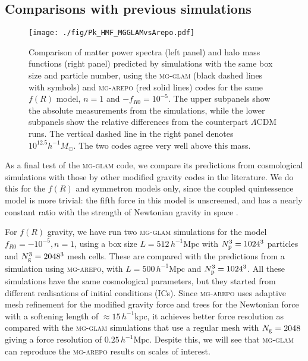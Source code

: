 \subsection{Comparisons with previous simulations}
\label{subsect:comparions}

\begin{figure}
    \centering 
    \texttt{[image: ./fig/Pk\_HMF\_MGGLAMvsArepo.pdf]}
    \caption{Comparison of matter power spectra (left panel) and halo mass functions (right panel) predicted by simulations with the same box size and particle number, using the \textsc{mg-glam} (black dashed lines with symbols) and \textsc{mg-arepo} (red solid lines) codes for the same $f(R)$ model, $n=1$ and $-f_{R0}=10^{-5}$. The upper subpanels show the absolute measurements from the simulations, while the lower subpanels show the relative differences from the counterpart $\Lambda$CDM runs. The vertical dashed line in the right panel denotes $10^{12.5}h^{-1}M_\odot$. The two codes agree very well above this mass.
    }
    \label{fig:Pk_hmf_MGGLAMvsArepo}
\end{figure}

As a final test of the \textsc{mg-glam} code, we compare its predictions from cosmological simulations with those by other modified gravity codes in the literature. We do this for the $f(R)$ and symmetron models only, since the coupled quintessence model is more trivial: the fifth force in this model is unscreened, and has a nearly constant ratio with the strength of Newtonian gravity in space \cite{Li:2010re}. 

For $f(R)$ gravity, we have run two \textsc{mg-glam} simulations for the model $f_{R0}=-10^{-5}, n=1$, using a box size $L=512 \, h^{-1}\mathrm{Mpc}$ with $N_{\rm p}^3 = 1024^3$ particles and  $N_{\rm g}^3=2048^3$ mesh cells. These are compared with the predictions from a simulation using \textsc{mg-arepo}, with $L = 500 \, h^{-1}\mathrm{Mpc}$ and $N_{\rm p}^3 = 1024^3$. All these simulations have the same cosmological parameters, but they started from different realisations of initial conditions (ICs). Since \textsc{mg-arepo} uses adaptive mesh refinement for the modified gravity force and trees for the Newtonian force with a softening length of $\approx 15 \, h^{-1}\mathrm{kpc}$, it achieves better force resolution as compared with the \textsc{mg-glam} simulations that use a regular mesh with $N_{\rm g}=2048$ giving a force resolution of $0.25 \, h^{-1}\mathrm{Mpc}$. Despite this, we will see that \textsc{mg-glam} can reproduce the \textsc{mg-arepo} results on scales of interest.




